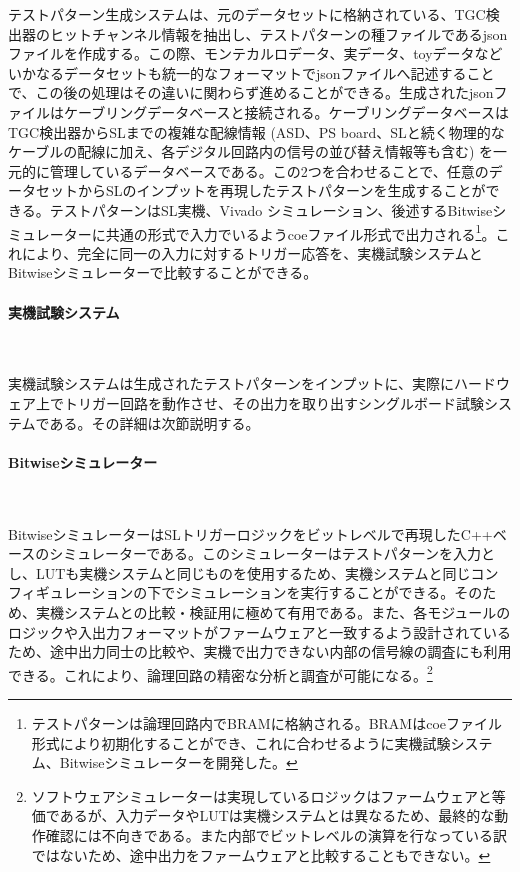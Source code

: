 テストパターン生成システムは、元のデータセットに格納されている、TGC検出器のヒットチャンネル情報を抽出し、テストパターンの種ファイルであるjsonファイルを作成する。この際、モンテカルロデータ、実データ、toyデータなどいかなるデータセットも統一的なフォーマットでjsonファイルへ記述することで、この後の処理はその違いに関わらず進めることができる。生成されたjsonファイルはケーブリングデータベースと接続される。ケーブリングデータベースはTGC検出器からSLまでの複雑な配線情報 (ASD、PS board、SLと続く物理的なケーブルの配線に加え、各デジタル回路内の信号の並び替え情報等も含む) を一元的に管理しているデータベースである。この2つを合わせることで、任意のデータセットからSLのインプットを再現したテストパターンを生成することができる。テストパターンはSL実機、Vivado シミュレーション、後述するBitwiseシミュレーターに共通の形式で入力でいるようcoeファイル形式で出力される\footnote{テストパターンは論理回路内でBRAMに格納される。BRAMはcoeファイル形式により初期化することができ、これに合わせるように実機試験システム、Bitwiseシミュレーターを開発した。}。これにより、完全に同一の入力に対するトリガー応答を、実機試験システムとBitwiseシミュレーターで比較することができる。

\paragraph{実機試験システム}　　
\par
実機試験システムは生成されたテストパターンをインプットに、実際にハードウェア上でトリガー回路を動作させ、その出力を取り出すシングルボード試験システムである。その詳細は次節説明する。

\paragraph{Bitwiseシミュレーター}　　
\par
BitwiseシミュレーターはSLトリガーロジックをビットレベルで再現したC++ベースのシミュレーターである。このシミュレーターはテストパターンを入力とし、LUTも実機システムと同じものを使用するため、実機システムと同じコンフィギュレーションの下でシミュレーションを実行することができる。そのため、実機システムとの比較・検証用に極めて有用である。また、各モジュールのロジックや入出力フォーマットがファームウェアと一致するよう設計されているため、途中出力同士の比較や、実機で出力できない内部の信号線の調査にも利用できる。これにより、論理回路の精密な分析と調査が可能になる。\footnote{ソフトウェアシミュレーターは実現しているロジックはファームウェアと等価であるが、入力データやLUTは実機システムとは異なるため、最終的な動作確認には不向きである。また内部でビットレベルの演算を行なっている訳ではないため、途中出力をファームウェアと比較することもできない。}

